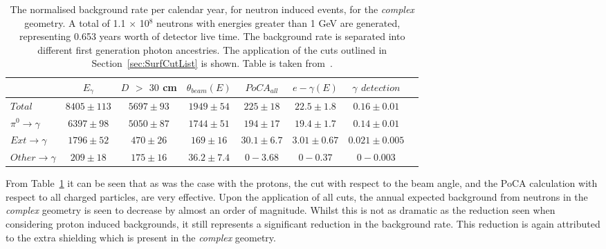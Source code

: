 \begin{table}
  \caption[The normalised background rate per calendar year, for neutron induced events, for the \emph{complex} geometry]
          {The normalised background rate per calendar year, for neutron induced events, for the \emph{complex} geometry. A total of 1.1 $\times$ 10$^8$ neutrons with energies greater than 1 GeV are generated, representing 0.653 years worth of detector live time. The background rate is separated into different first generation photon ancestries. The application of the cuts outlined in Section~\ref{sec:SurfCutList} is shown. Table is taken from~\citep{MartinsThesis}.}
  \label{tab:SurfNeuComp}
  \centering
  \scriptsize
  \begin{tabular}{l c c c c c c c }
    \toprule
        & $E_\gamma$ & $D$ $>$ $30$ cm & $\theta_{beam}(E)$ & $PoCA_{all}$ & $e-\gamma(E)$ & $\gamma$ $detection$ \\
        \midrule
        $Total$          & $8405\pm113$ & $5697\pm93$ & $1949\pm54$  & $225\pm18$   & $22.5\pm1.8$  & $0.16\pm0.01$ \\

        $\pi^0\to\gamma$ & $6397\pm98$  & $5050\pm87$ & $1744\pm51$  & $194\pm17$   & $19.4\pm1.7$  & $0.14\pm0.01$ \\

        $Ext\to\gamma$   & $1796\pm52$  & $470\pm26$  & $169\pm16$   & $30.1\pm6.7$ & $3.01\pm0.67$ & $0.021\pm0.005$ \\

        $Other\to\gamma$ & $209\pm18$   & $175\pm16$  & $36.2\pm7.4$ & $0-3.68$     & $0-0.37$      & $0-0.003$ \\
        \bottomrule
  \end{tabular}
\end{table}

From Table~\ref{tab:SurfNeuComp} it can be seen that as was the case with the protons, the cut with respect to the beam angle, and the PoCA calculation with respect to all charged particles, are very effective. Upon the application of all cuts, the annual expected background from neutrons in the \emph{complex} geometry is seen to decrease by almost an order of magnitude. Whilst this is not as dramatic as the reduction seen when considering proton induced backgrounds, it still represents a significant reduction in the background rate. This reduction is again attributed to the extra shielding which is present in the \emph{complex} geometry. \\

